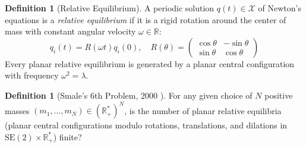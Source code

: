 \documentclass[11pt,a4paper]{article}
\theoremstyle{definition}
\newtheorem{definition}[theorem]{Definition}
\begin{document}
\begin{definition}[Relative Equilibrium]\label{def:relative_equilibrium}
A periodic solution $q(t) \in \mathcal{X}$ of Newton's equations is a \emph{relative equilibrium} if it is a rigid rotation around the center of mass with constant angular velocity $\omega \in \mathbb{R}$:
\begin{equation}\label{eq:rel_eq}
q_i(t) = R(\omega t) q_i(0), \quad R(\theta) = \begin{pmatrix} \cos\theta & -\sin\theta \\ \sin\theta & \cos\theta \end{pmatrix}
\end{equation}
Every planar relative equilibrium is generated by a planar central configuration with frequency $\omega^2 = \lambda$.
\end{definition}

\begin{definition}[Smale's 6th Problem, 2000 \cite{smale2000}]\label{def:smale_6}
For any given choice of $N$ positive masses $(m_1, \dots, m_N) \in (\mathbb{R}_+^*)^N$, is the number of planar relative equilibria (planar central configurations modulo rotations, translations, and dilations in $\mathrm{SE}(2) \times \mathbb{R}_+^*$) finite?
\end{definition}
\end{document}

